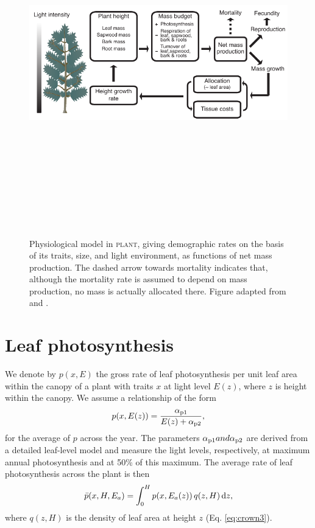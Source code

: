 \documentclass[10pt,twoside]{article}
\newcommand{\plant}{\textsc{plant}}
\begin{document}
\begin{figure}[h!]
\centering
\includegraphics[width=15cm,height=15cm,keepaspectratio]{figures/schematic-phys}
\caption{Physiological model in {\plant}, giving
demographic rates on the basis of its traits, size, and light environment, as functions of
net mass production. The dashed arrow towards mortality indicates that, although the mortality rate is assumed to depend on mass production, no
mass is actually allocated there. Figure adapted from
\citet{Falster-2011} and \citet{Falster-2015}.}
\label{fig:schematic-phys}
\end{figure}

\section{Leaf photosynthesis}\label{leaf-photosynthesis}

We denote by \(p(x, E)\) the gross rate of leaf photosynthesis per unit
leaf area within the canopy of a plant with traits \(x\) at light
level \(E(z)\), where \(z\) is height within the canopy.
We assume a relationship of the form
\begin{equation}\label{eq:photosynthesis}
p(x, E(z)) = \frac{\alpha_{{\rm p1}}}{E(z) + \alpha_{{\rm p2}}},
\end{equation}
for the average of \(p\) across the year. The parameters
\(\alpha_{{\rm p1}} and \alpha_{{\rm p2}}\) are derived from a detailed leaf-level
model and measure the light levels, respectively, at maximum annual photosynthesis and at 50\% of this maximum. The average rate of
leaf photosynthesis across the plant is then
\begin{equation}\label{eq:photosynthesis_av}
\bar{p}(x, H, E_{a}) = \int_0^H p(x, E_a(z)) \, q(z, H) \, {\rm d}z,
\end{equation}
where \(q(z, H)\) is the density of leaf area at height \(z\) (Eq.
\ref{eq:crown3}).
\end{document}
